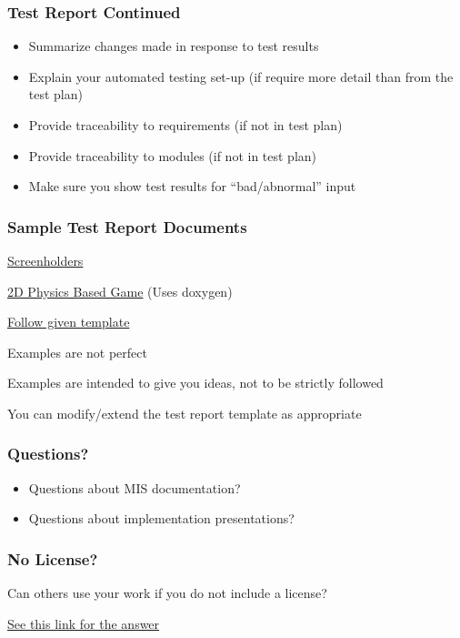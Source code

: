 \documentclass[t,12pt,numbers,fleqn]{beamer}
\begin{document}
\begin{frame}
\frametitle{Test Report Continued}
\begin{itemize}
\item Summarize changes made in response to test results
\item Explain your automated testing set-up (if require more detail than from
  the test plan)
\item Provide traceability to requirements (if not in test plan)
\item Provide traceability to modules (if not in test plan)
\item Make sure you show test results for ``bad/abnormal'' input
\end{itemize}
\end{frame}


\begin{frame}
\frametitle{Sample Test Report Documents} 

\bi
\item
  \href{https://gitlab.cas.mcmaster.ca/screenholders/screenholders}{Screenholders}
\item
  \href{https://github.com/palmerst/CS-4ZP6/tree/master}{2D Physics Based Game}
  (Uses doxygen)
\item
  \href{https://gitlab.cas.mcmaster.ca/smiths/cas741/tree/master/BlankProjectTemplate/Doc/TestReport}{Follow given template}
\item Examples are not perfect
\item Examples are intended to give you ideas, not to be strictly followed
\item You can modify/extend the test report template as appropriate
\ei

\end{frame}


\begin{frame}
\frametitle{Questions?}
\begin{itemize}
\item Questions about MIS documentation?
\item Questions about implementation presentations?
\end{itemize}
\end{frame}


\begin{frame}
\frametitle{No License?}

\bi
\item Can others use your work if you do not include a license?
\item \href{http://choosealicense.com/no-license/}{See this link for the answer}
\ei

\end{frame}
\end{document}
